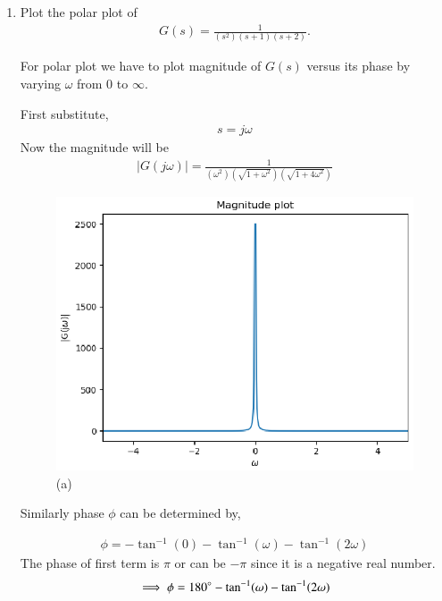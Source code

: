 \begin{enumerate}[label=\thesection.\arabic*.,ref=\thesection.\theenumi]
\item Plot the polar plot of 
\begin{align}
G(s) = \frac{1}{(s^2)(s+1)(s+2)}. 
\end{align}

\solution
For polar plot we have to plot magnitude of $G(s)$ versus its phase
by varying $\omega$ from 0 to $\infty$.

First substitute, 
\begin{align}
    s = j\omega
\end{align}
Now the magnitude will be
\begin{align}
    |G(j\omega)| = \frac{1}{(\omega^2)(\sqrt{1 + \omega^2})(\sqrt{1+4\omega^2})}
    \label{eq:two}
\end{align}

\begin{figure}[!h]
  \includegraphics[width=\columnwidth]{./figs/ee18btech11028/magnitude.eps}
  \caption{(a)}
  \label{fig:magnitude}
\end{figure}

Similarly phase $\phi$ can be determined by,

\begin{align}
  \phi = - \tan^{-1}(0) - \tan^{-1}(\omega) - \tan^{-1}(2\omega)
\end{align}
The phase of first term is $\pi$ or can be $-\pi$ since it is a negative real number.
\begin{align}
    \implies \phi = 180\degree - \tan^{-1}(\omega) - \tan^{-1}(2\omega)
    \label{eq:one}
\end{align}


\end{enumerate}
